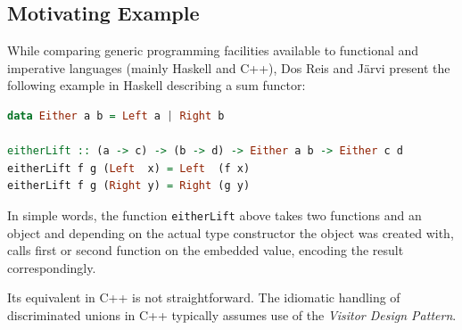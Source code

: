 \documentclass[preprint]{sigplanconf}
\DeclareRobustCommand{\codehaskell}[1]{{\lstinline[breaklines=false,language=Haskell]{#1}}}
\begin{document}


\subsection{Motivating Example}
\label{sec:xmpl}

While comparing generic programming facilities available to functional and 
imperative languages (mainly Haskell and C++), Dos Reis and J\"arvi present the 
following example in Haskell describing a sum functor\cite{DRJ05}:

\begin{lstlisting}[language=Haskell]
data Either a b = Left a | Right b

eitherLift :: (a -> c) -> (b -> d) -> Either a b -> Either c d
eitherLift f g (Left  x) = Left  (f x)
eitherLift f g (Right y) = Right (g y)
\end{lstlisting}

In simple words, the function \codehaskell{eitherLift} above takes two functions and an 
object and depending on the actual type constructor the object was created with, 
calls first or second function on the embedded value, encoding the result 
correspondingly.

Its equivalent in C++ is not straightforward. The idiomatic handling of 
discriminated unions in C++ typically assumes use of the \emph{Visitor Design 
Pattern}\cite{DesignPatterns1993}.
\end{document}
